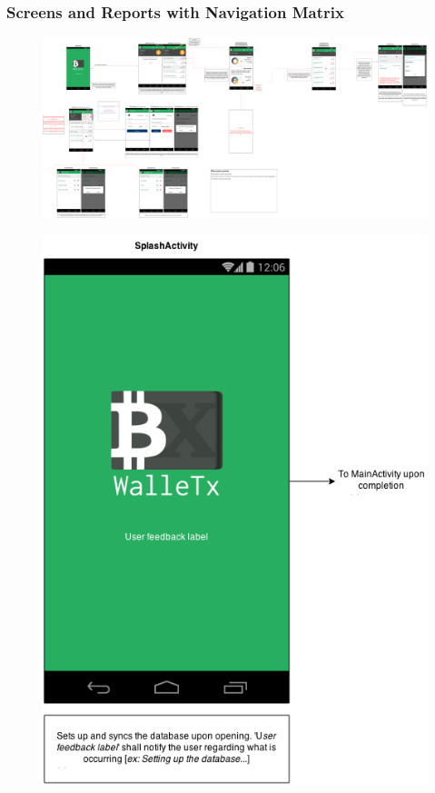     \subsubsection{Screens and Reports with Navigation Matrix}

  \begin{figure}[H]
     \includegraphics[width=1.0\textwidth]{../diagrams/storyboard_master.png}
  \end{figure}
  \begin{figure}[H]
     \includegraphics[width=1.0\textwidth]{../diagrams/storyboard_splash.png}
  \end{figure}
